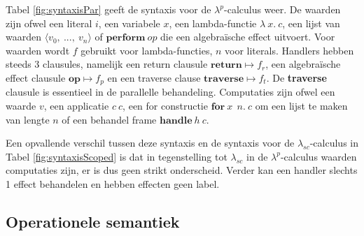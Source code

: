 Tabel \ref{fig:syntaxisPar} geeft de syntaxis voor de $\lambda^{p}$-calculus weer. De waarden zijn ofwel een literal $i$, een variabele $x$, een lambda-functie $\lambda\:x.\:c$, een lijst van waarden $\langle v_{0},\: ...,\: v_{n} \rangle$ of $\textbf{perform}\:op$ die een algebraïsche effect uitvoert. Voor waarden wordt $f$ gebruikt voor lambda-functies, $n$ voor literals. Handlers hebben steeds 3 clausules, namelijk een return clausule $\textbf{return} \mapsto f_{r}$, een algebraïsche effect clausule $\textbf{op} \mapsto f_{p}$ en een traverse clause $\textbf{traverse} \mapsto f_{t}$. De \textbf{traverse} clausule is essentieel in de parallelle behandeling.  Computaties zijn ofwel een waarde $v$, een applicatie $c\:c$, een for constructie $\textbf{for}\:x\:\:n.\:c$ om een lijst te maken van lengte $n$ of een behandel frame $\textbf{handle}\:h\:c$. \newline

Een opvallende verschil tussen deze syntaxis en de syntaxis voor de $\lambda_{sc}$-calculus in Tabel \ref{fig:syntaxisScoped} is dat in tegenstelling tot $\lambda_{sc}$ in de $\lambda^{p}$-calculus waarden computaties zijn, er is dus geen strikt onderscheid. Verder kan een handler slechts 1 effect behandelen en hebben effecten geen label.

\subsection{Operationele semantiek}

